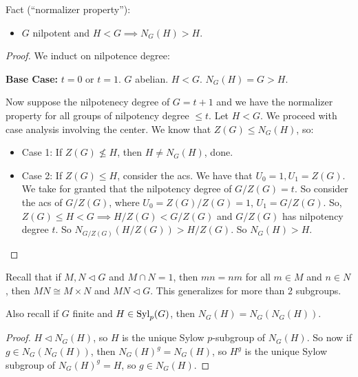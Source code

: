 \documentclass{report}
\begin{document}
Fact (``normalizer property''):
\begin{itemize}
    \item $G$ nilpotent and $H < G \implies N_G(H) > H$.
\end{itemize}
\begin{proof}
    We induct on nilpotence degree:

    \textbf{Base Case:} $t = 0$ or $t=1$. $G$ abelian. $H < G$. $N_G(H) = G > H$.

    Now suppose the nilpotenecy degree of $G = t +1$ and we have the normalizer property for all groups of nilpotency degree $\leq t$. Let $H < G$. We proceed with case analysis involving the center. We know that $Z(G) \leq N_G(H)$, so:
    \begin{itemize}
        \item Case 1: If $Z(G) \not\leq H$, then $H \neq N_G(H)$, done. 
        \item Case 2: If $Z(G) \leq H$, consider the acs. We have that $U_0 = 1, U_1 = Z(G)$. We take for granted that the nilpotency degree of $G/Z(G) = t$. So consider the acs of $G/Z(G)$, where $U_0 = Z(G)/Z(G) = 1$, $U_1 = G/Z(G)$. So, $Z(G) \leq H < G \implies H/Z(G) < G/Z(G)$ and $G/Z(G)$ has nilpotency degree $t$. So $N_{G/Z(G)}(H/Z(G)) > H/Z(G)$. So $N_G(H) > H$.
    \end{itemize}
    
\end{proof}

Recall that if $M,N \lhd G$ and $M \cap N = 1$, then $mn = nm$ for all $m \in M$ and $n \in N$, then $MN \cong M \times N$ and $MN \lhd G$. This generalizes for more than 2 subgroups.

Also recall if $G$ finite and $H \in \operatorname{Syl}_p(G)$, then $N_G(H)  = N_G(N_G(H))$.
\begin{proof}
    $H \lhd N_G(H)$, so $H$ is the unique Sylow $p$-subgroup of $N_G(H)$. So now if $g \in N_G(N_G(H))$, then $N_G(H)^g = N_G(H)$, so $H^g$ is the unique Sylow subgroup of $N_G(H)^g = H$, so $g \in N_G(H)$.
\end{proof}
\end{document}

